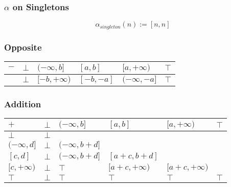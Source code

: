 \documentclass{beamer}
\begin{document}
                    \begin{frame}
                        \frametitle{\( \alpha \) on Singletons}
                        \[
                            \alpha_{singleton}(n) := [n, n]  
                        \]
                    \end{frame}
                    
                    
                    \begin{frame}
                        \frametitle{Opposite}
                        \begin{table}[]
                            \begin{tabular}{|l|l|l|l|l|l|}
                            \hline
                            $-$ & $\bot$ & $(-\infty , b]$ & $[a, b]$   & $[a, + \infty )$  & $\top$ \\ \hline
                                & $\bot$ & $[-b, + \infty )$ & $[-b, -a]$ & $(- \infty , -a]$ & $\top$ \\ \hline
                            \end{tabular}
                            \end{table}
                    \end{frame}

                    
        \begin{frame}
            \frametitle{Addition}
    \begin{table}[]
        \begin{tabular}{|l|l|l|l|l|l|}
        \hline
        $+$            & $\bot$ & $(-\infty, b]$     & $[a, b]$           & $[a, +\infty)$     & $\top$ \\ \hline
        $\bot$         & $\bot$ &                    &                    &                    &        \\ \hline
        $(-\infty, d]$ & $\bot$ & $(-\infty, b + d]$ &                    &                    &        \\ \hline
        $[c, d]$       & $\bot$ & $(-\infty, b + d]$ & $[a + c, b + d]$   &                    &        \\ \hline
        $[c, +\infty)$ & $\bot$ & $\top$             & $[a + c, +\infty)$ & $[a + c, +\infty)$ &        \\ \hline
        $\top$         & $\bot$ & $\top$             & $\top$             & $\top$             & $\top$ \\ \hline
        \end{tabular}
        \end{table}
    \end{frame}
    
\end{document}
